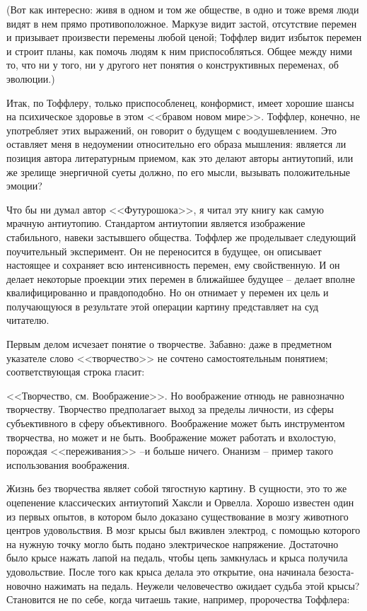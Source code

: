 \documentclass{book}
\begin{document}
(Вот как интересно: живя в одном и том же обществе, в од­но и тоже время люди видят в нем прямо противоположное. Маркузе видит застой, отсутствие перемен и призывает произ­вести перемены любой ценой; Тоффлер видит избыток пере­мен и строит планы, как помочь людям к ним приспособлять­ся. Общее между ними то, что ни у того, ни у другого нет поня­тия о конструктивных  переменах, об эволюции.)

Итак, по Тоффлеру, только приспособленец, конформист, имеет хорошие шансы на психическое здоровье в этом <<бра­вом новом мире>>. Тоффлер, конечно, не употребляет этих вы­ражений, он говорит о будущем с воодушевлением. Это остав­ляет меня в недоумении относительно его образа мышления: является ли позиция автора литературным приемом, как это делают авторы антиутопий, или же зрелище энергичной суеты должно, по его мысли, вызывать положительные эмоции?

Что бы ни думал автор <<Футурошока>>, я читал эту книгу как самую мрачную антиутопию. Стандартом антиутопии являет­ся изображение стабильного, навеки застывшего общества. Тоффлер же проделывает следующий поучительный экспери­мент. Он не переносится в будущее, он описывает настоящее и сохраняет всю интенсивность перемен, ему свойственную. И он делает некоторые проекции этих перемен в ближайшее буду­щее -- делает вполне квалифицированно и правдоподобно. Но он отнимает у перемен их цель и получающуюся в результате этой операции картину представляет на суд читателю.

Первым делом исчезает понятие о творчестве. Забавно: да­же в предметном указателе слово <<творчество>> не сочтено са­мостоятельным понятием; соответствующая строка гласит:

<<Творчество,  см. Воображение>>.  Но воображение отнюдь не равнозначно творчеству. Творчество предполагает выход за пределы личности, из сферы субъективного в сферу объективного. Воображение может быть инструментом творчества, но может и не быть. Воображение может работать и вхолостую, порож­дая <<переживания>> --и больше ничего. Онанизм -- пример та­кого использования воображения.

Жизнь без творчества являет собой тягостную картину. В сущ­ности, это то же оцепенение классических антиутопий Хаксли и Орвелла. Хорошо известен один из первых опытов, в котором было доказано существование в мозгу животного центров удо­вольствия. В мозг крысы был вживлен электрод, с помощью которого на нужную точку могло быть подано электрическое напряжение. Достаточно было крысе нажать лапой на педаль, чтобы цепь замкнулась и крыса получила удовольствие. Пос­ле того как крыса делала это открытие, она начинала безоста­новочно нажимать на педаль. Неужели человечество ожидает судьба этой крысы? Становится не по себе, когда читаешь такие, например, пророчества Тоффлера:
\end{document}
